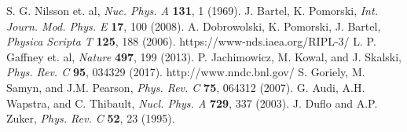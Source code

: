 \documentclass[a4paper,polish]{article}
\numberwithin{equation}{section}
\begin{document}
\begin{thebibliography}{9}
S. G. Nilsson et. al, \textit{Nuc. Phys. A} \textbf{131}, 1 (1969).
J. Bartel, K. Pomorski, \textit{Int. Journ. Mod. Phys. E} \textbf{17}, 100 (2008).
A. Dobrowolski, K. Pomorski, J. Bartel, \textit{Physica Scripta T} \textbf{125}, 188 (2006). 
https://www-nds.iaea.org/RIPL-3/
L. P. Gaffney et. al, \textit{Nature}  \textbf{497}, 199 (2013). 
P. Jachimowicz, M. Kowal, and J. Skalski, \textit{Phys. Rev. C} \textbf{95}, 034329 (2017).
http://www.nndc.bnl.gov/
S. Goriely, M. Samyn, and J.M. Pearson,  \textit{Phys. Rev. C} \textbf{75}, 064312 (2007).
G. Audi, A.H. Wapstra, and C. Thibault,  \textit{Nucl. Phys. A} \textbf{729}, 337 (2003).
J. Duflo and A.P. Zuker, \textit{Phys. Rev. C} \textbf{52}, 23 (1995).

\end{thebibliography}
\end{document}
